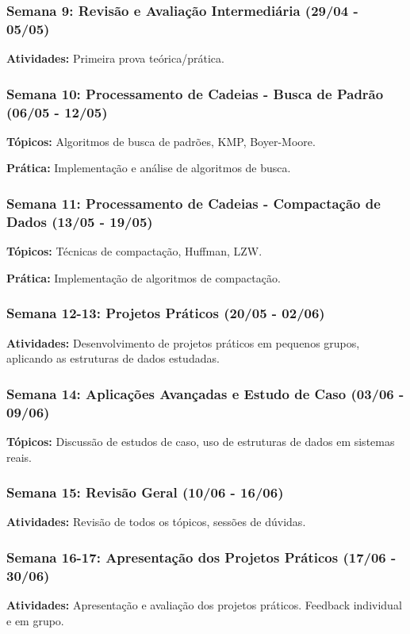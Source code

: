 \begin{frame}
  \frametitle{Semana 9: Revisão e Avaliação Intermediária (29/04 - 05/05)}
  \textbf{Atividades:} Primeira prova teórica/prática.
\end{frame}

\begin{frame}
  \frametitle{Semana 10: Processamento de Cadeias - Busca de Padrão (06/05 - 12/05)}
  \textbf{Tópicos:} Algoritmos de busca de padrões, KMP, Boyer-Moore.
  
  \textbf{Prática:} Implementação e análise de algoritmos de busca.
\end{frame}

\begin{frame}
  \frametitle{Semana 11: Processamento de Cadeias - Compactação de Dados (13/05 - 19/05)}
  \textbf{Tópicos:} Técnicas de compactação, Huffman, LZW.
  
  \textbf{Prática:} Implementação de algoritmos de compactação.
\end{frame}

\begin{frame}
  \frametitle{Semana 12-13: Projetos Práticos (20/05 - 02/06)}
  \textbf{Atividades:} Desenvolvimento de projetos práticos em pequenos grupos, aplicando as estruturas de dados estudadas.
\end{frame}

\begin{frame}
  \frametitle{Semana 14: Aplicações Avançadas e Estudo de Caso (03/06 - 09/06)}
  \textbf{Tópicos:} Discussão de estudos de caso, uso de estruturas de dados em sistemas reais.
\end{frame}

\begin{frame}
  \frametitle{Semana 15: Revisão Geral (10/06 - 16/06)}
  \textbf{Atividades:} Revisão de todos os tópicos, sessões de dúvidas.
\end{frame}

\begin{frame}
  \frametitle{Semana 16-17: Apresentação dos Projetos Práticos (17/06 - 30/06)}
  \textbf{Atividades:} Apresentação e avaliação dos projetos práticos. Feedback individual e em grupo.
\end{frame}

